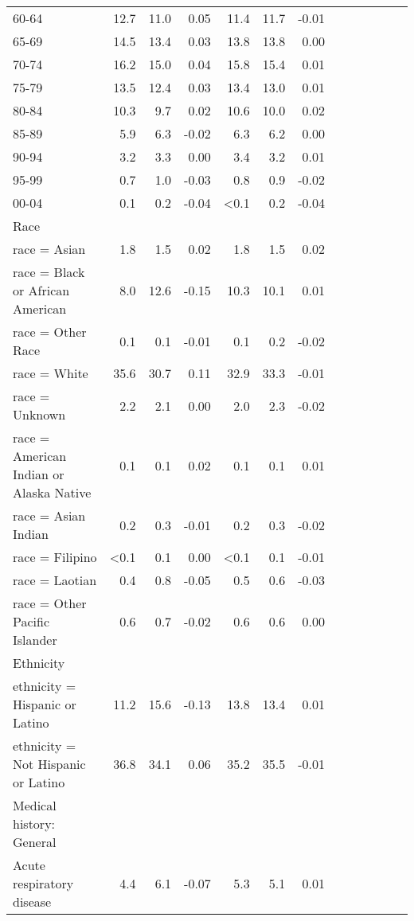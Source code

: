 \documentclass[11pt,]{article}
\begin{document}
\begin{longtable}{lrrrrrrrrrrrr}
      60-64 & 12.7 & 11.0 &  0.05 & 11.4 & 11.7 & -0.01 \\ 
      65-69 & 14.5 & 13.4 &  0.03 & 13.8 & 13.8 &  0.00 \\ 
      70-74 & 16.2 & 15.0 &  0.04 & 15.8 & 15.4 &  0.01 \\ 
      75-79 & 13.5 & 12.4 &  0.03 & 13.4 & 13.0 &  0.01 \\ 
      80-84 & 10.3 &  9.7 &  0.02 & 10.6 & 10.0 &  0.02 \\ 
      85-89 &  5.9 &  6.3 & -0.02 &  6.3 &  6.2 &  0.00 \\ 
      90-94 &  3.2 &  3.3 &  0.00 &  3.4 &  3.2 &  0.01 \\ 
      95-99 &  0.7 &  1.0 & -0.03 &  0.8 &  0.9 & -0.02 \\ 
      00-04 &  0.1 &  0.2 & -0.04 & <0.1 &  0.2 & -0.04 \\ 
  Race &    &    &     &    &    &     \\ 
      race = Asian &  1.8 &  1.5 &  0.02 &  1.8 &  1.5 &  0.02 \\ 
      race = Black or African American &  8.0 & 12.6 & -0.15 & 10.3 & 10.1 &  0.01 \\ 
      race = Other Race &  0.1 &  0.1 & -0.01 &  0.1 &  0.2 & -0.02 \\ 
      race = White & 35.6 & 30.7 &  0.11 & 32.9 & 33.3 & -0.01 \\ 
      race = Unknown &  2.2 &  2.1 &  0.00 &  2.0 &  2.3 & -0.02 \\ 
      race = American Indian or Alaska Native &  0.1 &  0.1 &  0.02 &  0.1 &  0.1 &  0.01 \\ 
      race = Asian Indian &  0.2 &  0.3 & -0.01 &  0.2 &  0.3 & -0.02 \\ 
      race = Filipino & <0.1 &  0.1 &  0.00 & <0.1 &  0.1 & -0.01 \\ 
      race = Laotian &  0.4 &  0.8 & -0.05 &  0.5 &  0.6 & -0.03 \\ 
      race = Other Pacific Islander &  0.6 &  0.7 & -0.02 &  0.6 &  0.6 &  0.00 \\ 
  Ethnicity &    &    &     &    &    &     \\ 
      ethnicity = Hispanic or Latino & 11.2 & 15.6 & -0.13 & 13.8 & 13.4 &  0.01 \\ 
      ethnicity = Not Hispanic or Latino & 36.8 & 34.1 &  0.06 & 35.2 & 35.5 & -0.01 \\ 
  Medical history: General &    &    &     &    &    &     \\ 
      Acute respiratory disease &  4.4 &  6.1 & -0.07 &  5.3 &  5.1 &  0.01 \\ 

\end{longtable}
\end{document}
